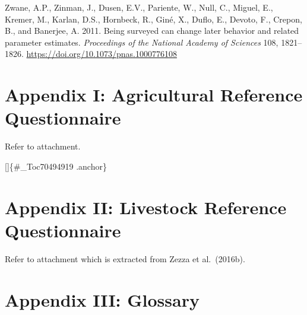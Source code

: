 \documentclass[
]{book}
\begin{document}
Zwane, A.P., Zinman, J., Dusen, E.V., Pariente, W., Null, C., Miguel, E., Kremer, M., Karlan, D.S., Hornbeck, R., Giné, X., Duflo, E., Devoto, F., Crepon, B., and Banerjee, A. 2011. Being surveyed can change later behavior and related parameter estimates. \emph{Proceedings of the National Academy of Sciences} 108, 1821--1826. \url{https://doi.org/10.1073/pnas.1000776108}

\hypertarget{appendix-appendix}{%
\appendix}


\hypertarget{appendix-i-agricultural-reference-questionnaire}{%
\chapter*{Appendix I: Agricultural Reference Questionnaire}\label{appendix-i-agricultural-reference-questionnaire}}

Refer to attachment.

{[}{]}\{\#\_Toc70494919 .anchor\}

\hypertarget{appendix-ii-livestock-reference-questionnaire}{%
\chapter*{Appendix II: Livestock Reference Questionnaire}\label{appendix-ii-livestock-reference-questionnaire}}

Refer to attachment which is extracted from Zezza et al.~(2016b).

\hypertarget{appendix-iii-glossary}{%
\chapter*{Appendix III: Glossary}\label{appendix-iii-glossary}}

\providecommand{\docline}[3]{\noalign{\global\setlength{\arrayrulewidth}{#1}}\arrayrulecolor[HTML]{#2}\cline{#3}}

\setlength{\tabcolsep}{2pt}

\renewcommand*{\arraystretch}{1.5}
\end{document}
